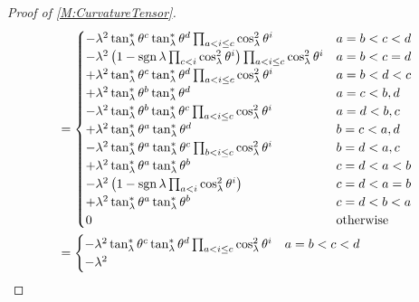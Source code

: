 \documentclass[../methodology.tex]{subfiles}
\begin{document}
\begin{proof}[Proof of \cref{M:CurvatureTensor}]
\begin{align*}
     & =\begin{cases}
          -\lambda^2\tan_\lambda^\ast\tensor{\theta}{^c}\tan_\lambda^\ast\tensor{\theta}{^d}\prod_{a<i\le c}\cos_\lambda^2\tensor{\theta}{^i}
            & \text{\(a=b<c<d\)} \\
          -\lambda^2
          \left(
          1-\sign{\lambda}\prod_{c<i}\cos_\lambda^2\tensor{\theta}{^i}
          \right)
          \prod_{a<i\le c}\cos_\lambda^2\tensor{\theta}{^i}
            & \text{\(a=b<c=d\)} \\
          +\lambda^2\tan_\lambda^\ast\tensor{\theta}{^c}\tan_\lambda^\ast\tensor{\theta}{^d}\prod_{a<i\le c}\cos_\lambda^2\tensor{\theta}{^i}
            & \text{\(a=b<d<c\)} \\
          +\lambda^2\tan_\lambda^\ast\tensor{\theta}{^b}\tan_\lambda^\ast\tensor{\theta}{^d}
            & \text{\(a=c<b,d\)} \\
          -\lambda^2\tan_\lambda^\ast\tensor{\theta}{^b}\tan_\lambda^\ast\tensor{\theta}{^c}\prod_{a<i\le c}\cos_\lambda^2\tensor{\theta}{^i}
            & \text{\(a=d<b,c\)} \\
          +\lambda^2\tan_\lambda^\ast\tensor{\theta}{^a}\tan_\lambda^\ast\tensor{\theta}{^d}
            & \text{\(b=c<a,d\)} \\
          -\lambda^2\tan_\lambda^\ast\tensor{\theta}{^a}\tan_\lambda^\ast\tensor{\theta}{^c}\prod_{b<i\le c}\cos_\lambda^2\tensor{\theta}{^i}
            & \text{\(b=d<a,c\)} \\
          +\lambda^2\tan_\lambda^\ast\tensor{\theta}{^a}\tan_\lambda^\ast\tensor{\theta}{^b}
            & \text{\(c=d<a<b\)} \\
          -\lambda^2
          \left(
          1-\sign{\lambda}\prod_{a<i}\cos_\lambda^2\tensor{\theta}{^i}
          \right)
            & \text{\(c=d<a=b\)} \\
          +\lambda^2\tan_\lambda^\ast\tensor{\theta}{^a}\tan_\lambda^\ast\tensor{\theta}{^b}
            & \text{\(c=d<b<a\)} \\
          0 & \text{otherwise}   \\
        \end{cases}                                                  \\
     & =\begin{cases}
          -\lambda^2\tan_\lambda^\ast\tensor{\theta}{^c}\tan_\lambda^\ast\tensor{\theta}{^d}\prod_{a<i\le c}\cos_\lambda^2\tensor{\theta}{^i}
            & \text{\(a=b<c<d\)}    \\
          -\lambda^2

\end{cases}
\end{align*}
\end{proof}
\end{document}
